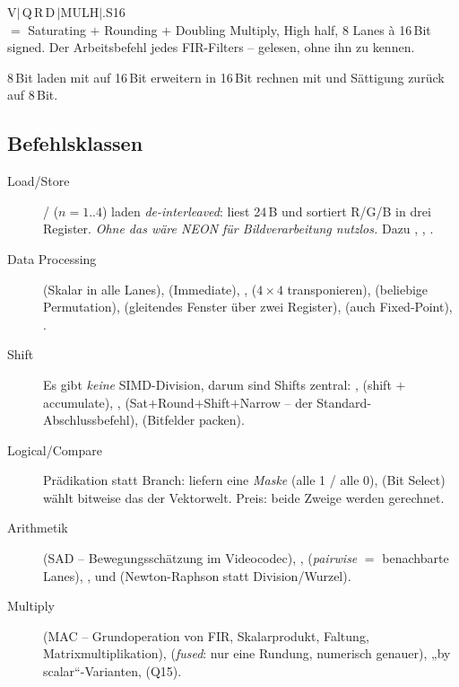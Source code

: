 \begin{bsp}
V$|$\,Q\,R\,D\,$|$MULH$|$.S16\\
$=$ Saturating $+$ Rounding $+$ Doubling Multiply, High half,
8 Lanes à 16\,Bit signed. Der Arbeitsbefehl jedes FIR-Filters --
gelesen, ohne ihn zu kennen.
\end{bsp}

 8\,Bit laden \ra mit  auf 16\,Bit erweitern
\ra in 16\,Bit rechnen \ra mit  und Sättigung zurück auf 8\,Bit.

\subsection{Befehlsklassen}
\begin{description}
\item[Load/Store] / ($n{=}1..4$) laden
  \emph{de-interleaved}:  liest 24\,B und sortiert R/G/B in drei
  Register. \emph{Ohne das wäre NEON für Bildverarbeitung nutzlos.}
  Dazu , , .
\item[Data Processing]  (Skalar in alle Lanes),
   (Immediate), ,  ($4{\times}4$
  transponieren),  (beliebige Permutation),
   (gleitendes Fenster über zwei Register),
   (auch Fixed-Point), .
\item[Shift] Es gibt \emph{keine} SIMD-Division, darum sind Shifts
  zentral: ,  (shift $+$ accumulate),
  ,  (Sat$+$Round$+$Shift$+$Narrow -- der
  Standard-Abschlussbefehl),  (Bitfelder packen).
\item[Logical/Compare] Prädikation statt Branch:
   liefern eine \emph{Maske} (alle 1 / alle 0),
   (Bit Select) wählt bitweise \ra das  der Vektorwelt.
  Preis: beide Zweige werden gerechnet.
\item[Arithmetik]  (SAD -- Bewegungsschätzung im Videocodec),
  ,  (\emph{pairwise} $=$ benachbarte Lanes),
  ,  und 
  (Newton-Raphson statt Division/Wurzel).
\item[Multiply]  (MAC -- Grundoperation von FIR,
  Skalarprodukt, Faltung, Matrixmultiplikation), 
  (\emph{fused}: nur eine Rundung, numerisch genauer),
  „by scalar“-Varianten,  (Q15).
\end{description}

